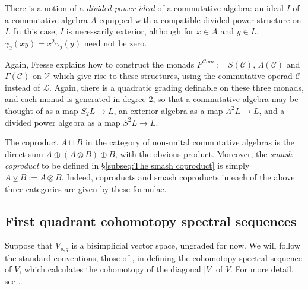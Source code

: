 \documentclass[11pt]{amsart} \renewcommand{\baselinestretch}{1.4}
\theoremstyle{plain}
\theoremstyle{definition}
\renewcommand{\to}{\longrightarrow}
\newcommand{\scrL}{\mathscr{L}}
\newcommand{\scrC}{\mathscr{C}}
\newcommand{\calV}{\mathcal{V}}
\newcommand{\citeBOX}[2][]{\cite[\mbox{#1}]{#2}}
\newcommand{\LieOperad}{{\scrL}}
\newcommand{\CommOperad}{{\scrC}}
\newcommand{\vect}[2]{\calV^{#1}_{#2}}
\newcommand{\algs}{{\scrC\!\textit{om}}}
\newcommand{\diag}[1]{|#1|}
\newcommand{\smashcoprod}{\veebar}%
\begin{document}
\begin{Conventions and notation}
There is a notion of a \emph{divided power ideal} of a commutative algebra: an ideal $I$ of a commutative algebra $A$ equipped with a compatible divided power structure on $I$. In this case, $I$ is necessarily exterior, although for $x\in A$ and $y\in L$, $\gamma_2(xy)=x^2\gamma_2(y)$ need not be zero.

Again, Fresse \cite{FresseSimplicialAlgs.pdf} explains how to construct the monads $F^{\algs}:=S(\CommOperad)$, $\Lambda(\CommOperad)$ and $\Gamma(\CommOperad)$ on $\vect{}{}$ which give rise to these structures, using the commutative operad $\CommOperad$ instead of $\LieOperad$. Again, there is a quadratic grading definable on these three monads, and each monad is generated in degree 2, so that a commutative algebra may be thought of as a  map $S_2L\to L$, an exterior algebra as a map $\Lambda^2L\to L$, and a divided power algebra as a map $S^2L\to L$.

The coproduct $A\sqcup B$ in the category of non-unital commutative algebras is the direct sum $A\oplus (A\otimes B)\oplus B$, with the obvious product. Moreover, the \emph{smash coproduct} to be defined in \S\ref{subseq:The smash coproduct} is simply $A\smashcoprod B:=A\otimes B$. Indeed, coproducts and smash coproducts in each of the above three categories are given by these formulae.

















\subsection{First quadrant cohomotopy spectral sequences}
Suppose that $V_{p,q}$ is a bisimplicial vector space, ungraded for now. We will follow the standard conventions, those of \cite{MR2245560}, in defining the cohomotopy spectral sequence of $V$, which calculates the cohomotopy of the diagonal $\diag{V} $ of $V$. For  more detail, see \citeBOX[\S1.15]{MR2245560}.   


\end{Conventions and notation}
\end{document}

